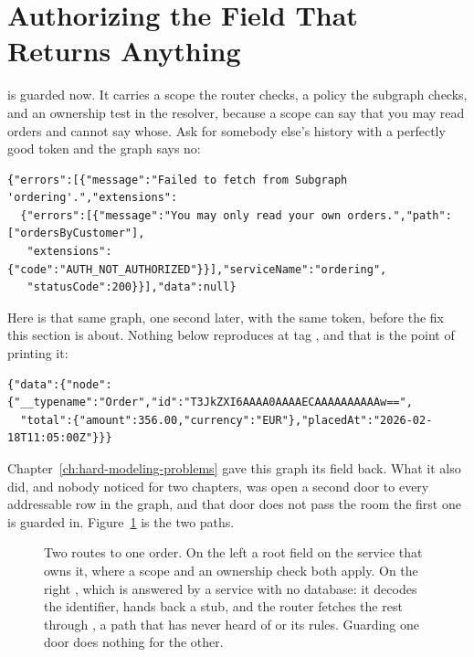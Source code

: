 \section{Authorizing the Field That Returns Anything}
\label{sec:ch15-the-field-that-returns-anything}
%

 is guarded now. It carries a scope the router
checks, a policy the subgraph checks, and an ownership test in the resolver,
because a scope can say that you may read orders and cannot say whose. Ask for
somebody else's history with a perfectly good token and the graph says no:

\begin{verbatim}
{"errors":[{"message":"Failed to fetch from Subgraph 'ordering'.","extensions":
  {"errors":[{"message":"You may only read your own orders.","path":["ordersByCustomer"],
   "extensions":{"code":"AUTH_NOT_AUTHORIZED"}}],"serviceName":"ordering",
   "statusCode":200}}],"data":null}
\end{verbatim}

Here is that same graph, one second later, with the same token, before the fix
this section is about. Nothing below reproduces at tag , and that is
the point of printing it:

\begin{verbatim}
{"data":{"node":{"__typename":"Order","id":"T3JkZXI6AAAA0AAAAECAAAAAAAAAAw==",
  "total":{"amount":356.00,"currency":"EUR"},"placedAt":"2026-02-18T11:05:00Z"}}}
\end{verbatim}

%
Chapter~\ref{ch:hard-modeling-problems} gave this graph its  field
back. What it also did, and nobody noticed for two chapters, was open a second
door to every addressable row in the graph, and that door does not pass the room
the first one is guarded in. Figure~\ref{fig:ch15-two-doors} is the two paths.

\begin{figure}[htbp]
  \centering
  
  \caption{Two routes to one order. On the left a root field on the service that
  owns it, where a scope and an ownership check both apply. On the right
  , which is answered by a service with no database: it decodes
  the identifier, hands back a stub, and the router fetches the rest through
  , a path that has never heard of  or
  its rules. Guarding one door does nothing for the other.}
  \label{fig:ch15-two-doors}
\end{figure}

